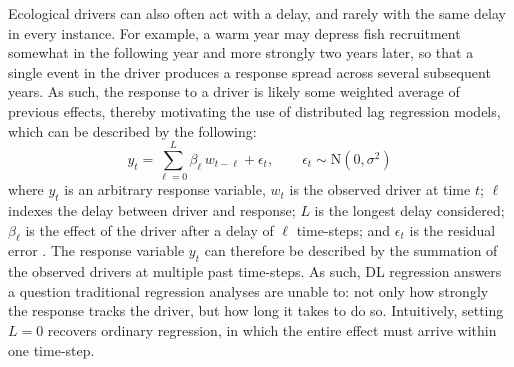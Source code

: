 \documentclass[12pt]{article}
\begin{document}
Ecological drivers can also often act with a delay, and rarely with the
same delay in every instance. For example, a warm year may depress fish
recruitment somewhat in the following year and more strongly two years
later, so that a single event in the driver produces a response spread
across several subsequent years. As such, the response to a driver is
likely some weighted average of previous effects, thereby motivating the
use of distributed lag regression models, which can be described by the
following:
\begin{equation}
  y_t = \sum_{\ell=0}^{L} \beta_\ell\, w_{t-\ell} + \epsilon_t,
  \qquad \epsilon_t \sim \mathrm{N}\!\left(0, \sigma^2\right)
  \label{eq:dl}
\end{equation}
where $y_t$ is an arbitrary response variable, $w_t$ is the observed
driver at time $t$; $\ell$ indexes the delay between driver and
response; $L$ is the longest delay considered; $\beta_\ell$ is the
effect of the driver after a delay of $\ell$ time-steps; and
$\epsilon_t$ is the residual error \citep{miller_adding_2025}. The
response variable $y_t$ can therefore be described by the summation of
the observed drivers at multiple past time-steps. As such, DL regression
answers a question traditional regression analyses are unable to: not
only how strongly the response tracks the driver, but how long it takes
to do so. Intuitively, setting $L = 0$ recovers ordinary regression, in
which the entire effect must arrive within one time-step.
\end{document}
